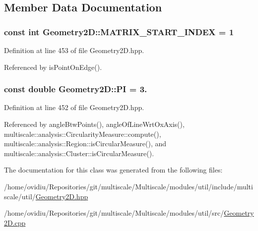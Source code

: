 \subsection{Member Data Documentation}
\hypertarget{classmultiscale_1_1Geometry2D_ade1d55d3ef110b73d42a3e4c4360ba17}{
\subsubsection[{M\-A\-T\-R\-I\-X\-\_\-\-S\-T\-A\-R\-T\-\_\-\-I\-N\-D\-E\-X}]{\setlength{\rightskip}{0pt plus 5cm}const int Geometry2\-D\-::\-M\-A\-T\-R\-I\-X\-\_\-\-S\-T\-A\-R\-T\-\_\-\-I\-N\-D\-E\-X = 1\hspace{0.3cm}{\ttfamily [static]}}}\label{classmultiscale_1_1Geometry2D_ade1d55d3ef110b73d42a3e4c4360ba17}


Definition at line 453 of file Geometry2\-D.\-hpp.



Referenced by is\-Point\-On\-Edge().

\hypertarget{classmultiscale_1_1Geometry2D_a7039b8bbe89283e22744c0631d597660}{
\subsubsection[{P\-I}]{\setlength{\rightskip}{0pt plus 5cm}const double Geometry2\-D\-::\-P\-I = 3.\hspace{0.3cm}{\ttfamily [static]}}}\label{classmultiscale_1_1Geometry2D_a7039b8bbe89283e22744c0631d597660}


Definition at line 452 of file Geometry2\-D.\-hpp.



Referenced by angle\-Btw\-Points(), angle\-Of\-Line\-Wrt\-Ox\-Axis(), multiscale\-::analysis\-::\-Circularity\-Measure\-::compute(), multiscale\-::analysis\-::\-Region\-::is\-Circular\-Measure(), and multiscale\-::analysis\-::\-Cluster\-::is\-Circular\-Measure().



The documentation for this class was generated from the following files\-:\begin{DoxyCompactItemize}
\item 
/home/ovidiu/\-Repositories/git/multiscale/\-Multiscale/modules/util/include/multiscale/util/\hyperlink{Geometry2D_8hpp}{Geometry2\-D.\-hpp}\item 
/home/ovidiu/\-Repositories/git/multiscale/\-Multiscale/modules/util/src/\hyperlink{Geometry2D_8cpp}{Geometry2\-D.\-cpp}\end{DoxyCompactItemize}
